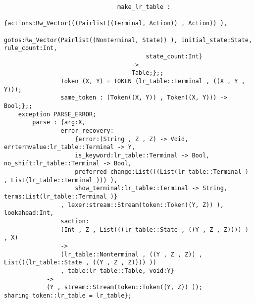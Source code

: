 \begin{verbatim}
                                make_lr_table :
                                        {actions:Rw_Vector(((Pairlist((Terminal, Action)) , Action)) ),
                                        gotos:Rw_Vector(Pairlist((Nonterminal, State)) ), initial_state:State, rule_count:Int,
                                        state_count:Int}
                                    ->
                                    Table;};;
                Token (X, Y) = TOKEN (lr_table::Terminal , ((X , Y , Y)));
                same_token : (Token((X, Y)) , Token((X, Y))) -> Bool;};;
    exception PARSE_ERROR;
        parse : {arg:X,
                error_recovery:
                    {error:(String , Z , Z) -> Void, errtermvalue:lr_table::Terminal -> Y,
                    is_keyword:lr_table::Terminal -> Bool, no_shift:lr_table::Terminal -> Bool,
                    preferred_change:List(((List(lr_table::Terminal ) , List(lr_table::Terminal ))) ),
                    show_terminal:lr_table::Terminal -> String, terms:List(lr_table::Terminal )}
                , lexer:stream::Stream(token::Token((Y, Z)) ), lookahead:Int,
                saction:
                (Int , Z , List(((lr_table::State , ((Y , Z , Z)))) ) , X)
                ->
                (lr_table::Nonterminal , ((Y , Z , Z)) , List(((lr_table::State , ((Y , Z , Z)))) ))
                , table:lr_table::Table, void:Y}
            ->
            (Y , stream::Stream(token::Token((Y, Z)) ));
sharing token::lr_table = lr_table};
\end{verbatim}

